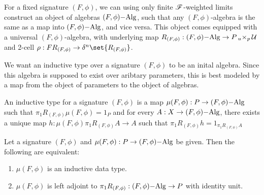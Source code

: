 \documentclass[../thesis.tex]{subfiles}
\begin{document}
\begin{remark}
  For a fixed signature $(F,\phi)$, we can using only finite $\sF$-weighted limits construct an object
  of algebras $(F,\phi)\Alg$, such that any $(F,\phi)$-algebra is the same as a map into $(F,\phi)\Alg$,
  and vice versa. This object comes equipped with a universal $(F,\phi)$-algebra, with underlying map
  $R_{(F,\phi)} : (F,\phi) \Alg \to P \pb[u]{p} \cU$ and 2-cell $\rho : F R_{(F,\phi)} \to \delta^n\set
  {R_{(F,\phi)}}$.
\end{remark}

We want an inductive type over a signature $(F,\phi)$ to be an inital algebra. Since this algebra is supposed
to exist over aribtary parameters, this is best modeled by a map from the object of parameters to the object
of algebras.

\begin{definition}
  An inductive type for a signature $(F,\phi)$ is a map $\mu(F,\phi) : P \to (F,\phi)\Alg$ such that
  $\pi_1 R_{(F,\phi)} \mu(F,\phi) = 1_P$ and for every $A : X \to (F,\phi)\Alg$, there exists a unique
  map $h : \mu(F,\phi)\pi_1R_{(F,\phi)} A \to A$ such that $\pi_1R_{(F,\phi)} h = 1_{\pi_1R_{(F,\phi)}A}$
\end{definition}
\begin{lemma}
  Let a signature $(F,\phi)$ and $\mu(F,\phi) : P \to (F,\phi)\Alg$ be given. Then the following are equivalent:
  \begin{enumerate}
    \item $\mu(F,\phi)$ is an inductive data type.
    \item $\mu(F,\phi)$ is left adjoint to $\pi_1 R_{(F,\phi)} : (F,\phi)\Alg \to P$ with identity unit.
  \end{enumerate}
\end{lemma}
\end{document}
